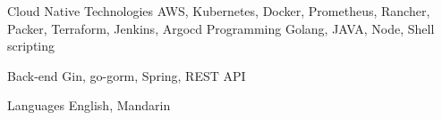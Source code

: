 

\begin{cvskills}

  \cvskill
    {Cloud Native Technologies} %
    {AWS, Kubernetes, Docker, Prometheus, Rancher, Packer, Terraform, Jenkins, Argocd} %
\cvskill
  {Programming} %
  {Golang, JAVA, Node, Shell scripting} %

  \cvskill
    {Back-end} %
    {Gin, go-gorm, Spring, REST API} %




  \cvskill
    {Languages} %
    {English, Mandarin} %

\end{cvskills}
